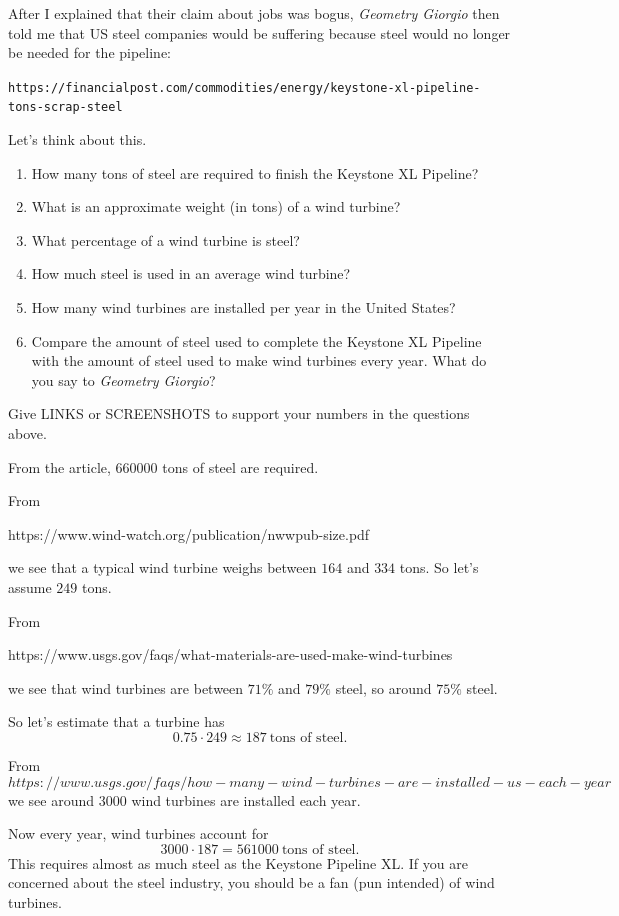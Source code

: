 \documentclass[handout,nooutcomes,noauthor]{ximera}
\begin{document}
\begin{question}
  After I explained that their claim about jobs was bogus,
  \textit{Geometry Giorgio} then told me that US steel companies would
  be suffering because steel would no longer be needed for the
  pipeline:
  \begin{center}
    \texttt{https://financialpost.com/commodities/energy/keystone-xl-pipeline-tons-scrap-steel}
  \end{center}
  Let's think about this.
  \begin{enumerate}
  \item How many tons of steel are required to finish the Keystone XL
    Pipeline?
  \item What is an approximate weight (in tons) of a wind turbine? 
  \item What percentage of a wind turbine is steel?
  \item How much steel is used in an average wind turbine?
  \item How many wind turbines are installed per year in the United States?
  \item Compare the amount of steel used to complete the Keystone XL
    Pipeline with the amount of steel used to make wind turbines every
    year. What do you say to \textit{Geometry Giorgio}?
  \end{enumerate}
  Give LINKS or SCREENSHOTS to support your numbers in the questions above.
  \begin{freeResponse}
  \item From the article, $660000$ tons of steel are required.
  \item From
    \begin{center}
      https://www.wind-watch.org/publication/nwwpub-size.pdf
    \end{center}
    we see that a typical wind turbine weighs between $164$ and $334$
    tons. So let's assume $249$ tons.
  \item From
    \begin{center}
      https://www.usgs.gov/faqs/what-materials-are-used-make-wind-turbines
    \end{center}
    we see that wind turbines are between $71\%$ and $79\%$ steel, so
    around $75\%$ steel.
  \item So let's estimate that a turbine has
    \[
    0.75\cdot 249 \approx 187~\text{tons of steel}. 
    \]
  \item From
    \[
    https://www.usgs.gov/faqs/how-many-wind-turbines-are-installed-us-each-year
    \]
    we see around $3000$ wind turbines are installed each year.
  \item Now every year, wind turbines account for
    \[
    3000 \cdot 187 = 561000~\text{tons of steel.}
    \]
    This requires almost as much steel as the Keystone Pipeline XL.
    If you are concerned about the steel industry, you should be a fan
    (pun intended) of wind turbines.
  \end{freeResponse}
\end{question}
\end{document}
